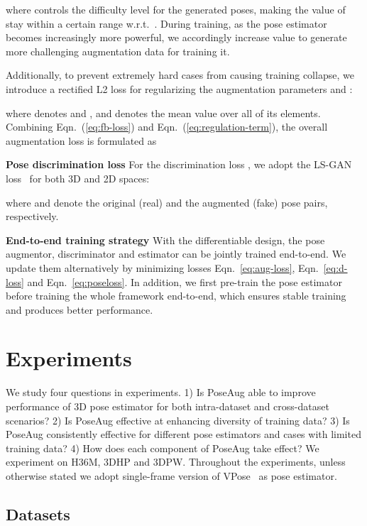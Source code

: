 \documentclass[final]{cvpr}
\newcommand{\myparagraph}[1]{{ \noindent \bf #1}}
\begin{document}
where  controls the difficulty level for the generated poses,  making the value of  stay within a certain range w.r.t.\  .
During training, as the pose estimator becomes increasingly more powerful, we accordingly increase  value to generate more challenging augmentation data for training it.
 

Additionally, to prevent extremely hard cases from causing training collapse, we introduce a rectified  L2 loss for regularizing the augmentation parameters  and :

where  denotes {  and , 
and  denotes the mean value over all of its elements.}
Combining Eqn.~(\ref{eq:fb-loss}) and Eqn.~(\ref{eq:regulation-term}), the overall augmentation loss  is formulated as



\myparagraph{Pose discrimination loss}
For the discrimination loss , we adopt the LS-GAN loss~\cite{mao2017least} for both 3D and 2D spaces:

where  and  denote the original (real) and the augmented (fake) pose pairs, respectively.



\myparagraph{End-to-end training strategy}
With the differentiable design, the pose augmentor, discriminator and estimator can be jointly trained end-to-end. 
We update them alternatively by minimizing losses Eqn.~\eqref{eq:aug-loss}, Eqn.~\eqref{eq:d-loss} and Eqn.~\eqref{eq:poseloss}. 
In addition, we first pre-train the pose estimator  before training the whole framework end-to-end, which ensures stable training and produces better performance. \section{Experiments}

We study four questions in experiments.
1) Is PoseAug able to improve performance of 3D pose estimator for both intra-dataset and cross-dataset scenarios? 
2) Is PoseAug effective at enhancing diversity of training data?
3) Is PoseAug consistently effective for different pose estimators and cases with limited training data?
4) How does each component of PoseAug take effect?
We experiment on H36M, 3DHP and 3DPW. 
Throughout the experiments, unless otherwise stated we adopt  single-frame version of VPose~\cite{pavllo2019videopose3d} as pose estimator.


\subsection{Datasets}
\end{document}
